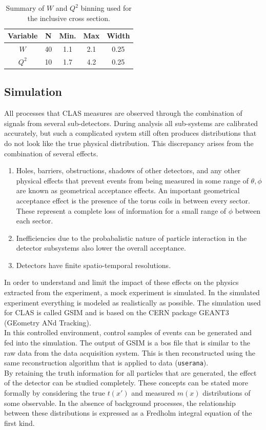 \begin{table}
  \centering
  \begin{tabular}{c|c|c|c|c}
    Variable & N & Min. & Max & Width \\
    \hline 
    $W$   & 40 & 1.1 & 2.1 & 0.25 \\
    $Q^2$ & 10 & 1.7 & 4.2 & 0.25
  \end{tabular}
  \caption{Summary of $W$ and $Q^2$ binning used for the inclusive cross section.}
\end{table}

\subsection{Simulation}
All processes that CLAS measures are observed through the combination of signals from several sub-detectors.  During analysis all sub-systems are calibrated accurately, but such a complicated system still often produces distributions that do not look like the true physical distribution.  This discrepancy arises from the combination of several effects.

\begin{enumerate}
	\item Holes, barriers, obstructions, shadows of other detectors, and any other physical effects that prevent events from being measured in some range of $\theta, \phi$ are known as geometrical acceptance effects.  An important geometrical acceptance effect is the presence of the torus coils in between every sector.  These represent a complete loss of information for a small range of $\phi$ between each sector.
	\item Inefficiencies due to the probabalistic nature of particle interaction in the detector subsystems also lower the overall acceptance.  
	\item Detectors have finite spatio-temporal resolutions.  
\end{enumerate}

In order to understand and limit the impact of these effects on the physics extracted from the experiment, a mock experiment is simulated.  In the simulated experiment everything is modeled as realistically as possible.  The simulation used for CLAS is called GSIM and is based on the CERN package GEANT3 (GEometry ANd Tracking).\\
In this controlled environment, control samples of events can be generated and fed into the simulation.  The output of GSIM is a bos file that is similar to the raw data from the data acquisition system. This is then reconstructed using the same reconstruction algorithm that is applied to data (\texttt{userana}).  \\ 
By retaining the truth information for all particles that are generated, the effect of the detector can be studied completely.  These concepts can be stated more formally by considering the true $t(x')$ and measured $m(x)$ distributions of some observable.  In the absence of background processes, the relationship between these distributions is expressed as a Fredholm integral equation of the first kind.

